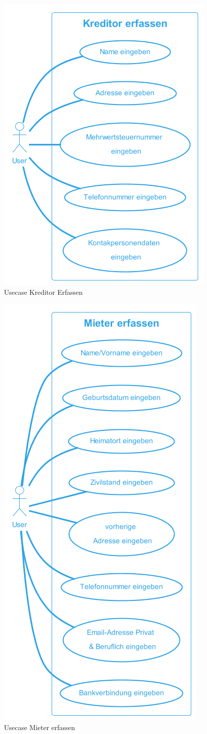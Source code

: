 \begin{figure}[H]
  \begin{center}
    \includegraphics[width=0.4\linewidth]{content/diagrams/out/usecase/kreditorErfassen/Kreditor erfassen.png}
    \caption{Usecase Kreditor Erfassen}
  \end{center}
  \label{kreditorErfassen}
\end{figure}

\begin{figure}[H]
  \begin{center}
    \includegraphics[width=0.4\linewidth]{content/diagrams/out/usecase/mieterErfassen/Mieter erfassen.png}
    \caption{Usecase Mieter erfassen}
  \end{center}
  \label{mieterErfassen}
\end{figure}

